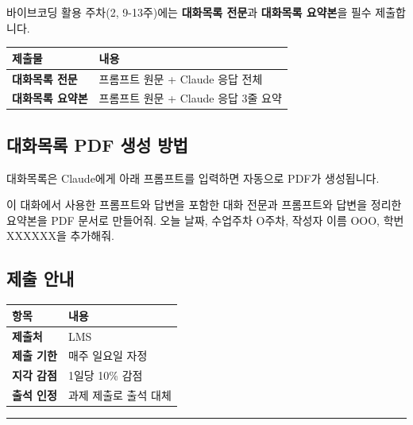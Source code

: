 \documentclass[11pt, a4paper]{article}
\begin{document}
바이브코딩 활용 주차(2, 9-13주)에는 \textbf{대화목록 전문}과 \textbf{대화목록 요약본}을 필수 제출합니다.

\begin{table}[h]
\centering
\begin{tabular}{|L{4cm}|L{9.5cm}|}
\hline
{}
\textbf{제출물} & \textbf{내용} \\
\hline
\textbf{대화목록 전문} & 프롬프트 원문 + Claude 응답 전체 \\
\hline
\textbf{대화목록 요약본} & 프롬프트 원문 + Claude 응답 3줄 요약 \\
\hline
\end{tabular}
\end{table}

\subsection{대화목록 PDF 생성 방법}

대화목록은 Claude에게 아래 프롬프트를 입력하면 자동으로 PDF가 생성됩니다.

\begin{tcolorbox}[colback=lightorange, colframe=accentorange, boxrule=0.5pt, title={\textbf{대화목록 PDF 생성 프롬프트}}, fonttitle=\bfseries]
\small
이 대화에서 사용한 프롬프트와 답변을 포함한 대화 전문과 프롬프트와 답변을 정리한 요약본을 PDF 문서로 만들어줘. 오늘 날짜, 수업주차 O주차, 작성자 이름 OOO, 학번 XXXXXX을 추가해줘.
\end{tcolorbox}

\subsection{제출 안내}

\begin{table}[h]
\centering
\begin{tabular}{|L{3cm}|L{10.5cm}|}
\hline
{}
\textbf{항목} & \textbf{내용} \\
\hline
\textbf{제출처} & LMS \\
\hline
\textbf{제출 기한} & 매주 일요일 자정 \\
\hline
\textbf{지각 감점} & 1일당 10\% 감점 \\
\hline
\textbf{출석 인정} & 과제 제출로 출석 대체 \\
\hline
\end{tabular}
\end{table}

\vspace{3pt}
\noindent\rule{\textwidth}{0.3pt}
\end{document}
